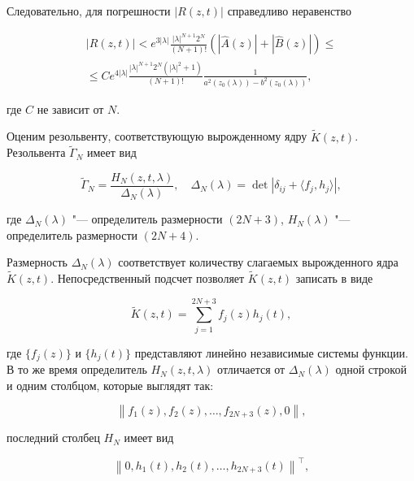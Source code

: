 Следовательно, для погрешности $|R(z,t)|$ справедливо неравенство

\begin{multline}

\label{iman:eq10}

\left| R(z,t) \right| < e^{3|\lambda |}    \frac{|\lambda |^{N + 1} 2^N }{(N + 1)!}   \left( | \hat A(z) | + | \hat B(z) | \right) \le\\

\le Ce^{4|\lambda |}    \frac{|\lambda |^{N + 1} 2^N (|\lambda |^2  + 1)}{(N + 1)!}   \frac{1}{a^2 (z_0 (\lambda )) - b^2 (z_0 (\lambda ))},

\end{multline}

где  $C$ не зависит от $N$.



Оценим резольвенту, соответствующую вырожденному ядру $\tilde K(z,t)$. Резольвента $\tilde \Gamma _N $ имеет вид

\[

\tilde \Gamma _N  = \frac{H_N (z,t,\lambda )}{\Delta _N (\lambda )},  \quad \Delta _N (\lambda ) = \det \left| \delta _{ij}  + \langle f_j ,h_j \rangle \right|,

\]

где  $\Delta _N (\lambda )$ "--- определитель размерности $(2N + 3)$, $H_N (\lambda )$ "--- определитель размерности $(2N + 4)$.



Размерность $\Delta _N (\lambda )$ соответствует количеству слагаемых вырожденного ядра $\tilde K(z,t)$. Непосредственный подсчет позволяет $\tilde K(z,t)$ записать в виде

\[

\tilde K(z,t) = \sum\limits_{j = 1}^{2N + 3} f_j (z)h_j (t),

\]

где $\{ f_j (z)\}$ и $\{ h_j (t)\} $ представляют линейно независимые системы функции. В то же время определитель $H_N (z,t,\lambda )$ отличается от $\Delta _N (\lambda ) $ одной строкой и одним столбцом, которые выглядят так:

\[

\left\| f_1 (z), f_2 (z), \ldots ,f_{2N + 3} (z),  0  \right\|,

\]

последний столбец $H_N$ имеет вид

\[

\left\| 0, h_1 (t), h_2 (t), \ldots ,h_{2N + 3} (t) \right\|^\top,

\]

